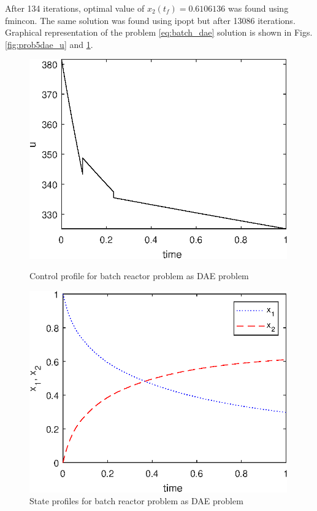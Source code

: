 After 134 iterations, optimal value of $x_{2}(t_{f}) = 0.6106136$ was
found using fmincon. The same solution was found using ipopt but after
13086 iterations. Graphical representation of the problem
\eqref{eq:batch_dae} solution is shown in Figs. \ref{fig:prob5dae_u}
and \ref{fig:prob5dae_x}.

\begin{figure}[htb]
\begin{minipage}[t]{0.5\linewidth}
\centering
\includegraphics[width=0.99\textwidth]{examples/problem5_dae/graphs/u_523daea.eps}
\caption[Tutorial example 6: control profile]{Control profile for
  batch reactor problem as DAE problem}\label{fig:prob5dae_u} 
\end{minipage}
\begin{minipage}[t]{0.5\linewidth}
\centering
\includegraphics[width=0.99\textwidth]{examples/problem5_dae/graphs/x12_523daea.eps}
\caption[Tutorial example 6: state profiles]{State profiles for batch
  reactor problem as DAE problem}\label{fig:prob5dae_x} 
\end{minipage}
\end{figure}

